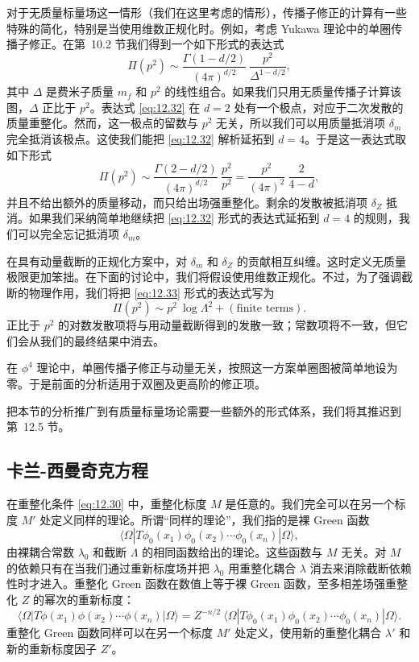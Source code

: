 对于无质量标量场这一情形（我们在这里考虑的情形），传播子修正的计算有一些特殊的简化，特别是当使用维数正规化时。例如，考虑 Yukawa 理论中的单圈传播子修正。在第~10.2 节我们得到一个如下形式的表达式
\begin{equation}
  \Pi(p^2) \sim \frac{\Gamma(1-d/2)}{(4\pi)^{d/2}}\ \frac{p^2}{\Delta^{1-d/2}}
  ,
  \label{eq:12.32}
\end{equation}
其中 $\Delta$ 是费米子质量 $m_f$ 和 $p^2$ 的线性组合。如果我们只用无质量传播子计算该图，$\Delta$ 正比于 $p^2$。表达式 \eqref{eq:12.32} 在 $d = 2$ 处有一个极点，对应于二次发散的质量重整化。然而，这一极点的留数与 $p^2$ 无关，所以我们可以用质量抵消项 $\delta_m$ 完全抵消该极点。这使我们能把 \eqref{eq:12.32} 解析延拓到 $d = 4$。于是这一表达式取如下形式
\begin{equation}
  \Pi(p^2) \sim \frac{\Gamma(2-d/2)}{(4\pi)^{d/2}}\ \frac{p^2}{p^2}
  = \frac{p^2}{(4\pi)^2}\ \frac{2}{4-d} ,
  \label{eq:12.33}
\end{equation}
并且不给出额外的质量移动，而只给出场强重整化。剩余的发散被抵消项 $\delta_Z$ 抵消。如果我们采纳简单地继续把 \eqref{eq:12.32} 形式的表达式延拓到 $d = 4$ 的规则，我们可以完全忘记抵消项 $\delta_m$。

在具有动量截断的正规化方案中，对 $\delta_m$ 和 $\delta_Z$ 的贡献相互纠缠。这时定义无质量极限更加笨拙。在下面的讨论中，我们将假设使用维数正规化。不过，为了强调截断的物理作用，我们将把 \eqref{eq:12.33} 形式的表达式写为
\begin{equation}
  \Pi(p^2) \sim p^2\ \log\Lambda^2 + (\text{finite terms}) .
  \label{eq:12.34}
\end{equation}
正比于 $p^2$ 的对数发散项将与用动量截断得到的发散一致；常数项将不一致，但它们会从我们的最终结果中消去。

在 $\phi^4$ 理论中，单圈传播子修正与动量无关，按照这一方案单圈图被简单地设为零。于是前面的分析适用于双圈及更高阶的修正项。

把本节的分析推广到有质量标量场论需要一些额外的形式体系，我们将其推迟到第~12.5 节。

\subsection{卡兰-西曼奇克方程}

在重整化条件 \eqref{eq:12.30} 中，重整化标度 $M$ 是任意的。我们完全可以在另一个标度 $M'$ 处定义同样的理论。所谓``同样的理论''，我们指的是裸 Green 函数
\begin{equation}
  \langle\Omega|T\phi_0(x_1)\phi_0(x_2)\cdots\phi_0(x_n)|\Omega\rangle ,
\end{equation}
由裸耦合常数 $\lambda_0$ 和截断 $\Lambda$ 的相同函数给出的理论。这些函数与 $M$ 无关。对 $M$ 的依赖只有在当我们通过重新标度场并把 $\lambda_0$ 用重整化耦合 $\lambda$ 消去来消除截断依赖性时才进入。重整化 Green 函数在数值上等于裸 Green 函数，至多相差场强重整化 $Z$ 的幂次的重新标度：
\begin{equation}
  \langle\Omega|T\phi(x_1)\phi(x_2)\cdots\phi(x_n)|\Omega\rangle
  = Z^{-n/2}\ \langle\Omega|T\phi_0(x_1)\phi_0(x_2)\cdots\phi_0(x_n)
    |\Omega\rangle .
  \label{eq:12.35}
\end{equation}
重整化 Green 函数同样可以在另一个标度 $M'$ 处定义，使用新的重整化耦合 $\lambda'$ 和新的重新标度因子 $Z'$。

